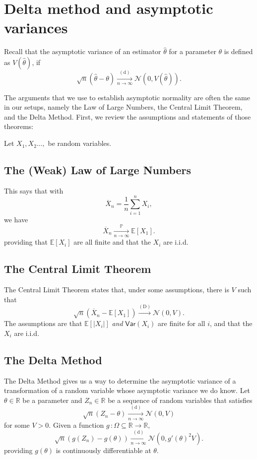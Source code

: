 \documentclass[10pt,landscape]{article}
\begin{document}
\section*{Delta method and asymptotic variances}

Recall that the asymptotic variance of an estimator $\widehat\theta$ for a parameter $\theta$ is defined as $V(\widehat{\theta })$, if
$$\sqrt{n}(\widehat{\theta } - \theta ) \xrightarrow [n \to \infty ]{\mathrm{(d)}} \mathcal{N}(0, V(\widehat{\theta })).$$

 The arguments that we use to establish asymptotic normality are often the same in our setups, namely the Law of Large Numbers, the Central Limit Theorem, and the Delta Method. First, we review the assumptions and statements of those theorems: 
 
 Let $X_1,X_2\dots,$ be random variables.\newline
 \subsection*{The (Weak) Law of Large Numbers}
 This says that with
$$\overline X_n=\frac{1}{n}\sum_{i=1}^n X_i,$$
we have
$$\overline X_n\xrightarrow[n\to\infty]{\mathbb{P}}\mathbb{E}[X_1].$$
providing that $\mathbb{E}[X_i]$ are all finite and that the $X_i$ are i.i.d.

\subsection*{The Central Limit Theorem}
The Central Limit Theorem states that, under some assumptions, there is $V$ such that
$$\sqrt{n} (\overline{X}_ n - \mathbb E[X_1]) \xrightarrow {\mathrm{(D)}} \mathcal{N}(0,V).$$
The assumptions are that $\mathbb{E}[|X_i|]$ \emph{and} $\textsf{Var}(X_ i)$ are finite for all $i$, and that the $X_i$ are i.i.d.

\subsection*{The Delta Method}
The Delta Method gives us a way to determine the asymptotic variance of a transformation of a random variable whose asymptotic variance we do know.\newline
Let $\theta \in \mathbb{R}$ be a parameter and $Z_n\in\mathbb{R}$ be a sequence of random variables that satisfies 
$$\sqrt{n}(Z_ n - \theta ) \xrightarrow [n \to \infty ]{\mathrm{(d)}} \mathcal{N}(0,V)$$
for some $V>0.$\newline
Given a function $g \,  \colon \Omega \subseteq \mathbb {R}\to \mathbb {R},$
$$\sqrt{n}(g(Z_ n) - g(\theta )) \xrightarrow [n \to \infty ]{\mathrm{(d)}} \mathcal{N}(0,g'(\theta )^2 V).$$
providing $g(\theta)$ is continuously differentiable at $\theta$.
\end{document}
